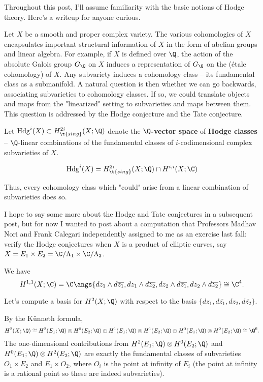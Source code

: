 Throughout this post, I'll assume familiarity with the basic notions of Hodge
theory. Here's a writeup for anyone curious. 


Let $X$ be a smooth and proper complex variety. The various cohomologies of $X$ encapsulates
important structural information of $X$ in the form of abelian groups and linear algebra.
For example, if $X$ is defined over $\Q$, the action of the absolute Galois group
$G_\Q$ on $X$ induces a representation of $G_\Q$ on the (\'{e}tale cohomology) of $X$. 
Any subvariety induces a cohomology class -- its fundamental class as a submanifold. 
A natural question is then whether we can go backwards, associating subvarieties to 
cohomology classes. If so, we could translate objects and maps from the "linearized" setting
to subvarieties and maps between them. This question is addressed by the Hodge conjecture
and the Tate conjecture.


Let $\mathrm{Hdg}^i(X) \subset H^{2i}_{\t{sing}}(X;\Q)$ denote the \textbf{$\Q$-vector space}
of \textbf{Hodge classes} -- $\Q$-linear combinations of the fundamental classes of 
$i$-codimensional complex subvarieties of $X$. 

\begin{conjecture}[Hodge]
  \begin{equation}
    \label{eq:1}
    \mathrm{Hdg}^i(X) = H^{2i}_{\t{sing}}(X;\Q) \cap H^{i,i}(X;\C)
  \end{equation}
\end{conjecture}

Thus, every cohomology class which "could" arise from a linear combination
of subvarieties does so. 



I hope to say some more about the Hodge and Tate conjectures in a subsequent post, but for
now I wanted to post about a computation that Professors Madhav Nori and Frank Calegari
independently assigned to me as an exercise last fall: verify the Hodge conjectures
when $X$ is a product of elliptic curves, say
$X = E_1 \times E_2 = \C/\Lambda_1 \times \C/\Lambda_2$.


We have
\[H^{1,1}(X;\C) = \C\angs{dz_1 \wedge d\overline{z_1}, dz_1 \wedge d\overline{z_2}, dz_2 \wedge d\overline{z_1}, dz_2 \wedge d\overline{z_2}} \cong \C^4.\]

Let's compute a basis for $H^2(X;\Q)$ with respect to the basis 
$\{dz_1, d\overline{z_1}, dz_2, d\overline{z_2}\}$. 

By the K\"unneth formula, 
\[H^2(X;\Q) \cong H^2(E_1;\Q) \otimes H^0(E_2;\Q) \oplus H^1(E_1;\Q) \otimes H^1(E_2;\Q) \oplus H^0(E_1;\Q) \otimes H^2(E_2;\Q) \cong \Q^6.\]
The one-dimensional contributions from $H^2(E_1;\Q) \otimes H^0(E_2;\Q)$ and $H^0(E_1;\Q) \otimes H^2(E_2;\Q)$
are exactly the fundamental classes of subvarieties $O_1 \times E_2$ and $E_1 \times O_2$,
where $O_i$ is the point at infinity of $E_i$ (the point at infinity
is a rational point so these are indeed subvarieties).


